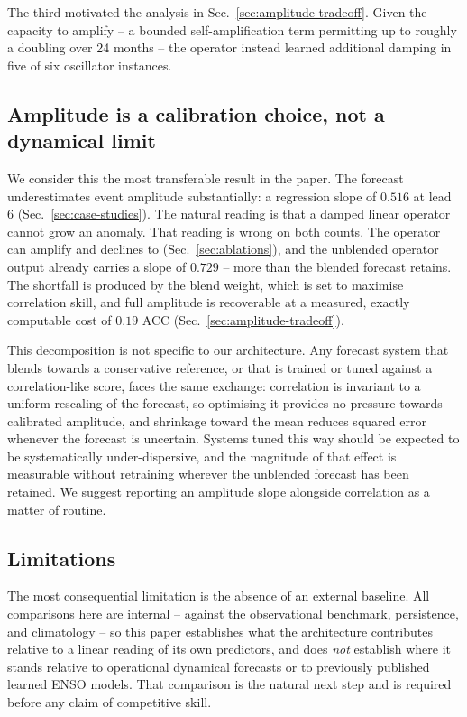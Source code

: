 The third motivated the analysis in Sec.~\ref{sec:amplitude-tradeoff}. Given the capacity to
amplify -- a bounded self-amplification term permitting up to roughly a doubling over 24
months -- the operator instead learned additional damping in five of six oscillator instances.

\subsection{Amplitude is a calibration choice, not a dynamical limit}

We consider this the most transferable result in the paper. The forecast underestimates event
amplitude substantially: a regression slope of $0.516$ at lead 6
(Sec.~\ref{sec:case-studies}). The natural reading is that a damped linear operator cannot grow
an anomaly. That reading is wrong on both counts. The operator can amplify and declines to
(Sec.~\ref{sec:ablations}), and the unblended operator output already carries a slope of
$0.729$ -- more than the blended forecast retains. The shortfall is produced by the blend
weight, which is set to maximise correlation skill, and full amplitude is recoverable at a
measured, exactly computable cost of $0.19$ ACC (Sec.~\ref{sec:amplitude-tradeoff}).

This decomposition is not specific to our architecture. Any forecast system that blends towards
a conservative reference, or that is trained or tuned against a correlation-like score, faces
the same exchange: correlation is invariant to a uniform rescaling of the forecast, so
optimising it provides no pressure towards calibrated amplitude, and shrinkage toward the mean
reduces squared error whenever the forecast is uncertain. Systems tuned this way should be
expected to be systematically under-dispersive, and the magnitude of that effect is measurable
without retraining wherever the unblended forecast has been retained. We suggest reporting an
amplitude slope alongside correlation as a matter of routine.

\subsection{Limitations}

The most consequential limitation is the absence of an external baseline. All comparisons here
are internal -- against the observational benchmark, persistence, and climatology -- so this
paper establishes what the architecture contributes relative to a linear reading of its own
predictors, and does \emph{not} establish where it stands relative to operational dynamical
forecasts or to previously published learned ENSO models. That comparison is the natural next
step and is required before any claim of competitive skill.

